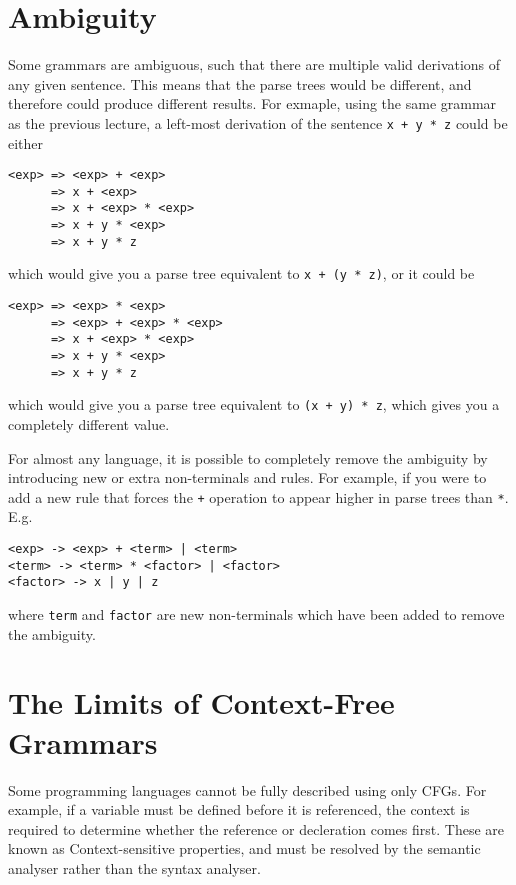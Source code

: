 
\section*{Ambiguity}

Some grammars are ambiguous, such that there are multiple valid derivations of any given sentence. This means that the
 parse trees would be different, and therefore could produce different results. For exmaple, using the same grammar as
 the previous lecture, a left-most derivation of the sentence \verb`x + y * z` could be either
\begin{verbatim}
<exp> => <exp> + <exp>
      => x + <exp>
      => x + <exp> * <exp>
      => x + y * <exp>
      => x + y * z
\end{verbatim}
which would give you a parse tree equivalent to \verb`x + (y * z)`, or it could be
\begin{verbatim}
<exp> => <exp> * <exp>
      => <exp> + <exp> * <exp>
      => x + <exp> * <exp>
      => x + y * <exp>
      => x + y * z
\end{verbatim}
which would give you a parse tree equivalent to \verb`(x + y) * z`, which gives you a completely different value.

For almost any language, it is possible to completely remove the ambiguity by introducing new or extra non-terminals
 and rules. For example, if you were to add a new rule that forces the \verb`+` operation to appear higher in parse
 trees than \verb`*`. E.g.
\begin{verbatim}
<exp> -> <exp> + <term> | <term>
<term> -> <term> * <factor> | <factor>
<factor> -> x | y | z
\end{verbatim}
where \verb`term` and \verb`factor` are new non-terminals which have been added to remove the ambiguity.

\section*{The Limits of Context-Free Grammars}

Some programming languages cannot be fully described using only CFGs. For example, if a variable must be defined before
 it is referenced, the context is required to determine whether the reference or decleration comes first. These are 
 known as Context-sensitive properties, and must be resolved by the semantic analyser rather than the syntax analyser.

